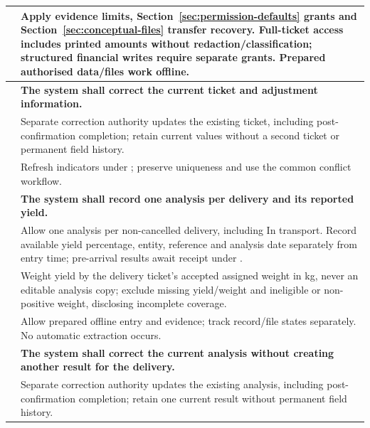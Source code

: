 {\begin{longtable}{L{0.18}L{0.82}}
\label{ac:049:d} & Apply  evidence limits, Section~\ref{sec:permission-defaults} grants and Section~\ref{sec:conceptual-files} transfer recovery. Full-ticket access includes printed amounts without redaction/classification; structured financial writes require separate grants. Prepared authorised data/files work offline.\\
\midrule
{}
\label{fr:050}\textbf{} & \textbf{The system shall correct the current ticket and adjustment information.}\\*
\label{ac:050:a} & Separate correction authority updates the existing ticket, including post-confirmation completion; retain current values without a second ticket or permanent field history.\\
\label{ac:050:b} & Refresh indicators under ; preserve uniqueness and use the common conflict workflow.\\
\midrule
{}
\label{fr:051}\textbf{} & \textbf{The system shall record one analysis per delivery and its reported yield.}\\*
\label{ac:051:a} & Allow one analysis per non-cancelled delivery, including In transport. Record available yield percentage, entity, reference and analysis date separately from entry time; pre-arrival results await receipt under .\\
\label{ac:051:b} & Weight yield by the delivery ticket's accepted assigned weight in kg, never an editable analysis copy; exclude missing yield/weight and ineligible or non-positive weight, disclosing incomplete coverage.\\
\label{ac:051:c} & Allow prepared offline entry and  evidence; track record/file states separately. No automatic extraction occurs.\\
\midrule
{}
\label{fr:052}\textbf{} & \textbf{The system shall correct the current analysis without creating another result for the delivery.}\\*
\label{ac:052:a} & Separate correction authority updates the existing analysis, including post-confirmation completion; retain one current result without permanent field history.\\

\end{longtable}}
